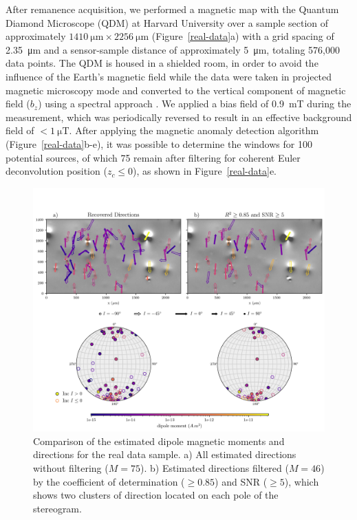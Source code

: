 After remanence acquisition, we performed a magnetic map with the Quantum
Diamond Microscope (QDM) at Harvard University over a sample section of
approximately $\qty{1410}{\um} \times \qty{2256}{\um}$ (Figure~\ref{real-data}a) with a grid
spacing of \qty{2.35}{\um} and a sensor-sample distance of approximately \qty{5}{\um}, totaling
576,000 data points. The QDM is housed in a shielded room, in
order to avoid the influence of the Earth's magnetic field while the data were taken in projected magnetic microscopy mode and converted to the vertical component of magnetic field ($b_z$) using a spectral approach \citep{Lima2009, Fu2020,
Glenn2017}. We applied a bias field of \qty{0.9}{\milli\tesla} during the measurement, which was periodically reversed to result in an effective background field of $< \qty{1}{\micro\tesla}$.  After applying the magnetic anomaly detection algorithm (Figure~\ref{real-data}b-e), it was
possible to determine the windows for 100 potential sources, of which 75 remain after filtering for coherent Euler deconvolution position ($z_c \leq 0$), as shown in Figure~\ref{real-data}e.

\begin{figure}[tb!]
\centering
\includegraphics[width=1\linewidth]{figures/real-data-stereograms.png}
\caption{
Comparison of the estimated dipole magnetic moments and directions for the real data sample.
a) All estimated directions without filtering ($M=75$). b) Estimated directions filtered ($M=46$) by the coefficient of determination ($\geq 0.85$) and SNR ($\geq 5$), which shows two clusters of direction located on each pole of the stereogram.
}
\label{real-data-stereograms}
\end{figure}

